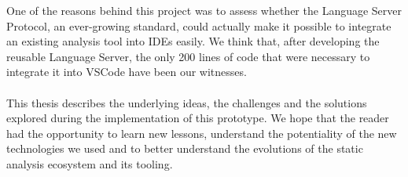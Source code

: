 One of the reasons behind this project was to assess whether the Language Server Protocol, an ever-growing standard, could actually make it possible to integrate an existing analysis tool into IDEs easily.
We think that, after developing the reusable Language Server, the only 200 lines of code that were necessary to integrate it into VSCode have been our witnesses.
\\\\
This thesis describes the underlying ideas, the challenges and the solutions explored during the implementation of this prototype. We hope that the reader had the opportunity to learn new lessons, understand the potentiality of the new technologies we used and to better understand the evolutions of the static analysis ecosystem and its tooling.
